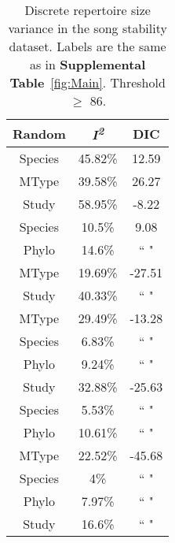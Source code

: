 \documentclass{article}
\begin{document}
  \begin{table}[H]
  \centering
  \caption{Discrete repertoire size variance in the song stability dataset. Labels are the same as in \textbf{Supplemental Table}~\ref{fig:Main}. Threshold $\ge$ 86.} 
  \begin{tabular}{ccc}
  \hline
  Random & \textit{I\textsuperscript{2}} & DIC \\ 
  \hline
  Species & 45.82\% & 12.59 \\ \hdashline
  MType & 39.58\% & 26.27 \\ \hdashline
  Study & 58.95\% & -8.22 \\ \hdashline
  Species & 10.5\% & 9.08 \\ 
  Phylo & 14.6\% & `` " \\ \hdashline
  MType & 19.69\% & -27.51 \\ 
  Study & 40.33\% & `` " \\ \hdashline
  MType & 29.49\% & -13.28 \\ 
  Species & 6.83\% & `` " \\ 
  Phylo & 9.24\% & `` " \\ \hdashline
  Study & 32.88\% & -25.63 \\ 
  Species & 5.53\% & `` " \\ 
  Phylo & 10.61\% & `` " \\ \hdashline
  MType & 22.52\% & -45.68 \\ 
  Species & 4\% & `` " \\ 
  Phylo & 7.97\% & `` " \\ 
  Study & 16.6\% & `` " \\ 
  \hline
  \end{tabular}
  \end{table}
\end{document}
